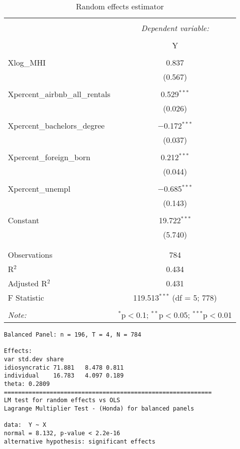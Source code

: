 \documentclass{article}
\begin{document}
\begin{table}[!htbp] \centering 
  \caption{Random effects estimator} 
  \label{} 
  \begin{tabular}{@{\extracolsep{5pt}}lc} 
    \\[-1.8ex]\hline 
    \hline \\[-1.8ex] 
    & \multicolumn{1}{c}{\textit{Dependent variable:}} \\ 
    \cline{2-2} 
    \\[-1.8ex] & Y \\ 
    \hline \\[-1.8ex] 
    Xlog\_MHI & 0.837 \\ 
    & (0.567) \\ 
    & \\ 
    Xpercent\_airbnb\_all\_rentals & 0.529$^{***}$ \\ 
    & (0.026) \\ 
    & \\ 
    Xpercent\_bachelors\_degree & $-$0.172$^{***}$ \\ 
    & (0.037) \\ 
    & \\ 
    Xpercent\_foreign\_born & 0.212$^{***}$ \\ 
    & (0.044) \\ 
    & \\ 
    Xpercent\_unempl & $-$0.685$^{***}$ \\ 
    & (0.143) \\ 
    & \\ 
    Constant & 19.722$^{***}$ \\ 
    & (5.740) \\ 
    & \\ 
    \hline \\[-1.8ex] 
    Observations & 784 \\ 
    R$^{2}$ & 0.434 \\ 
    Adjusted R$^{2}$ & 0.431 \\ 
    F Statistic & 119.513$^{***}$ (df = 5; 778) \\ 
    \hline 
    \hline \\[-1.8ex] 
    \textit{Note:}  & \multicolumn{1}{r}{$^{*}$p$<$0.1; $^{**}$p$<$0.05; $^{***}$p$<$0.01} \\ 
  \end{tabular} 


\begin{verbatim}
Balanced Panel: n = 196, T = 4, N = 784

Effects:
var std.dev share
idiosyncratic 71.881   8.478 0.811
individual    16.783   4.097 0.189
theta: 0.2809
===========================================================
LM test for random effects vs OLS
Lagrange Multiplier Test - (Honda) for balanced panels

data:  Y ~ X
normal = 8.132, p-value < 2.2e-16
alternative hypothesis: significant effects
\end{verbatim}

\end{table}
\end{document}
